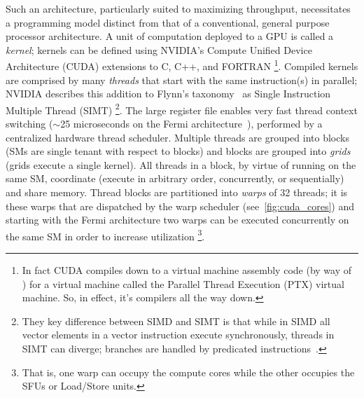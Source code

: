 Such an architecture, particularly suited to maximizing throughput, necessitates a programming model distinct from that of a conventional, general purpose processor architecture.
A unit of computation deployed to a GPU is called a \textit{kernel}; kernels can be defined using NVIDIA's Compute Unified Device Architecture (CUDA) extensions to C, C++, and FORTRAN%
\footnote{In fact CUDA compiles down to a virtual machine assembly code (by way of ) for a virtual machine called the Parallel Thread Execution (PTX) virtual machine. So, in effect, it's compilers all the way down.}.
Compiled kernels are comprised by many \textit{threads} that start with the same instruction(s) in parallel;
NVIDIA describes this addition to Flynn's taxonomy~\cite{5009071} as Single Instruction Multiple Thread (SIMT)%
\footnote{They key difference between SIMD and SIMT is that while in SIMD all vector elements in a vector instruction execute synchronously, threads in SIMT can diverge; branches are handled by predicated instructions~\cite{cuda_toolkit}.}.
The large register file enables very fast thread context switching ($\sim$25 microseconds on the Fermi architecture~\cite{Glaskowsky2009NVIDIAS}), performed by a centralized hardware thread scheduler.
Multiple threads are grouped into blocks (SMs are single tenant with respect to blocks) and blocks are grouped into \textit{grids} (grids execute a single kernel).
All threads in a block, by virtue of running on the same SM, coordinate (execute in arbitrary order, concurrently, or sequentially) and share memory.
Thread blocks are partitioned into \textit{warps} of 32 threads;
it is these warps that are dispatched by the warp scheduler (see~\cref{fig:cuda_cores}) and starting with the Fermi architecture two warps can be executed concurrently on the same SM in order to increase utilization%
\footnote{That is, one warp can occupy the compute cores while the other occupies the SFUs or Load/Store units.}.



